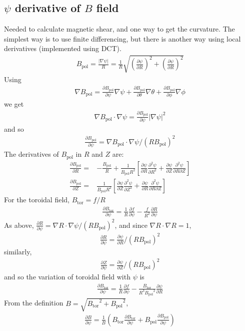 \documentclass[12pt]{article}
\newcommand{\deriv}[2]{\ensuremath{\frac{\partial #1}{\partial #2}}}
\newcommand{\dderiv}[2]{\ensuremath{\frac{\partial^2 #1}{\partial {#2}^2}}}
\newcommand{\Bp}{\ensuremath{B_{\text{pol}}}}
\newcommand{\Bt}{\ensuremath{B_{\text{tor}}}}
\begin{document}
\subsection{$\psi$ derivative of $B$ field}
Needed to calculate magnetic shear, and one way to get the curvature.
The simplest way is to use finite differencing, but there is another way
using local derivatives (implemented using DCT).
%
\begin{align*}
\Bp = \frac{\left|\nabla\psi\right|}{R} =
\frac{1}{R}\sqrt{\left(\deriv{\psi}{R}\right)^2 +
\left(\deriv{\psi}{R}\right)^2}
\end{align*}
%
Using
%
\begin{align*}
\nabla\Bp = \deriv{\Bp}{\psi}\nabla\psi + \deriv{\Bp}{\theta}\nabla\theta +
\deriv{\Bp}{\phi}\nabla\phi
\end{align*}
%
we get
%
\begin{align*}
\nabla\Bp \cdot\nabla\psi = \deriv{\Bp}{\psi}\left|\nabla\psi\right|^2
\end{align*}
%
and so
%
\begin{align*}
\deriv{\Bp}{\psi} = \nabla\Bp \cdot\nabla\psi / \left(R\Bp\right)^2
\end{align*}
%
The derivatives of $\Bp$ in $R$ and $Z$ are:
%
\begin{align*}
\deriv{\Bp}{R} =& -\frac{\Bp}{R} + \frac{1}{\Bp
R^2}\left[\deriv{\psi}{R}\dderiv{\psi}{R} +
\deriv{\psi}{Z}\frac{\partial^2\psi}{\partial R\partial Z}\right] \\
\deriv{\Bp}{Z} =& \frac{1}{\Bp R^2}\left[\deriv{\psi}{Z}\dderiv{\psi}{Z} +
\deriv{\psi}{R}\frac{\partial^2\psi}{\partial R\partial Z}\right]
\end{align*}
%
For the toroidal field, $\Bt = f/R$
%
\begin{align*}
\deriv{\Bt}{\psi} = \frac{1}{R}\deriv{f}{\psi} - \frac{f}{R^2}\deriv{R}{\psi}
\end{align*}
%
As above, $\deriv{R}{\psi} = \nabla R \cdot\nabla\psi / \left(R\Bp\right)^2$,
and since $\nabla R\cdot\nabla R = 1$,
%
\begin{align*}
\deriv{R}{\psi} = \deriv{\psi}{R} / \left(R\Bp\right)^2
\end{align*}
%
similarly,
%
\begin{align*}
\deriv{Z}{\psi} = \deriv{\psi}{Z} / \left(R\Bp\right)^2
\end{align*}
%
and so the variation of toroidal field with $\psi$ is
%
\begin{align*}
\deriv{\Bt}{\psi} = \frac{1}{R}\deriv{f}{\psi} -
\frac{\Bt}{R^3\Bp^2}\deriv{\psi}{R}
\end{align*}
%
From the definition $B=\sqrt{\Bt^2 + \Bp^2}$,
%
\begin{align*}
\deriv{B}{\psi} = \frac{1}{B}\left(\Bt\deriv{\Bt}{\psi} +
\Bp\deriv{\Bp}{\psi}\right)
\end{align*}
\end{document}
